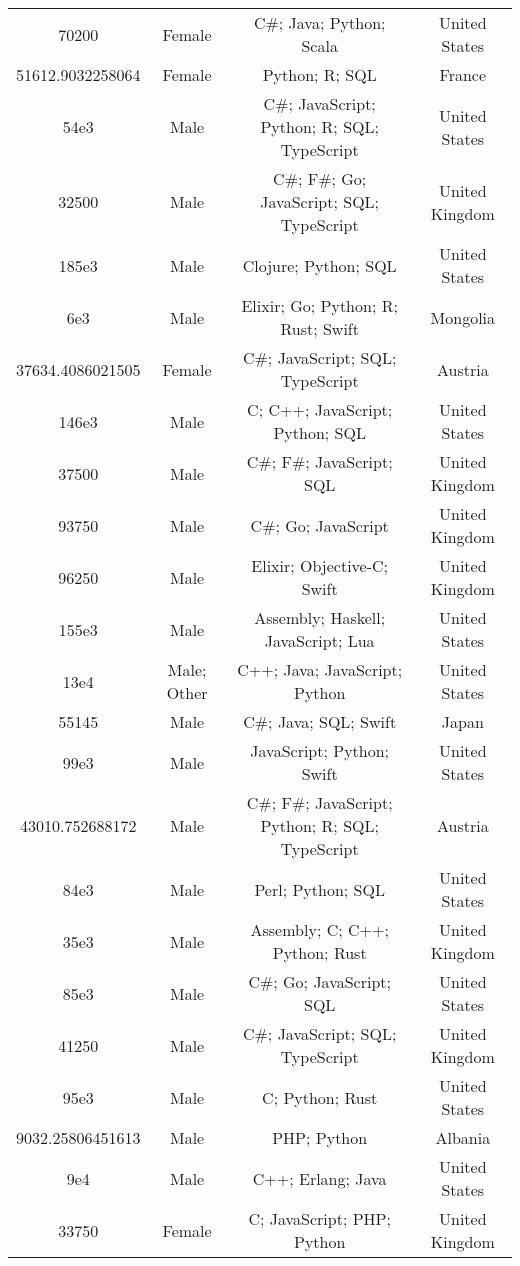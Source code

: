 \begin{center}
\begin{tabular}{ |c|c|c|c| }
70200  &  Female  &  C\#; Java; Python; Scala  &  United States  \\ 
51612.9032258064  &  Female  &  Python; R; SQL  &  France  \\ 
54e3  &  Male  &  C\#; JavaScript; Python; R; SQL; TypeScript  &  United States  \\ 
32500  &  Male  &  C\#; F\#; Go; JavaScript; SQL; TypeScript  &  United Kingdom  \\ 
185e3  &  Male  &  Clojure; Python; SQL  &  United States  \\ 
6e3  &  Male  &  Elixir; Go; Python; R; Rust; Swift  &  Mongolia  \\ 
37634.4086021505  &  Female  &  C\#; JavaScript; SQL; TypeScript  &  Austria  \\ 
146e3  &  Male  &  C; C++; JavaScript; Python; SQL  &  United States  \\ 
37500  &  Male  &  C\#; F\#; JavaScript; SQL  &  United Kingdom  \\ 
93750  &  Male  &  C\#; Go; JavaScript  &  United Kingdom  \\ 
96250  &  Male  &  Elixir; Objective-C; Swift  &  United Kingdom  \\ 
155e3  &  Male  &  Assembly; Haskell; JavaScript; Lua  &  United States  \\ 
13e4  &  Male; Other  &  C++; Java; JavaScript; Python  &  United States  \\ 
55145  &  Male  &  C\#; Java; SQL; Swift  &  Japan  \\ 
99e3  &  Male  &  JavaScript; Python; Swift  &  United States  \\ 
43010.752688172  &  Male  &  C\#; F\#; JavaScript; Python; R; SQL; TypeScript  &  Austria  \\ 
84e3  &  Male  &  Perl; Python; SQL  &  United States  \\ 
35e3  &  Male  &  Assembly; C; C++; Python; Rust  &  United Kingdom  \\ 
85e3  &  Male  &  C\#; Go; JavaScript; SQL  &  United States  \\ 
41250  &  Male  &  C\#; JavaScript; SQL; TypeScript  &  United Kingdom  \\ 
95e3  &  Male  &  C; Python; Rust  &  United States  \\ 
9032.25806451613  &  Male  &  PHP; Python  &  Albania  \\ 
9e4  &  Male  &  C++; Erlang; Java  &  United States  \\ 
33750  &  Female  &  C; JavaScript; PHP; Python  &  United Kingdom  \\ 

\end{tabular}
\end{center}

